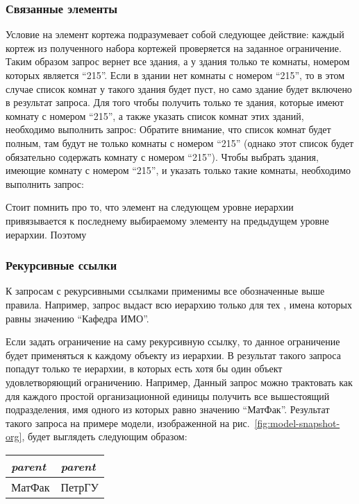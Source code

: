 \subsubsection{Связанные элементы}
Условие на элемент кортежа подразумевает собой следующее действие: каждый кортеж из полученного набора кортежей
проверяется на заданное ограничение. Таким образом запрос
вернет все здания, а у здания только те комнаты, номером которых является ``215''. Если в здании нет комнаты с 
номером ``215'', то в этом случае список комнат у такого здания будет пуст, но само здание будет
включено в результат запроса. Для того чтобы получить
только те здания, которые имеют комнату с номером ``215'', а также указать список комнат этих зданий, необходимо
выполнить запрос:
Обратите внимание, что список комнат будет полным, там будут не только комнаты с номером ``215'' (однако этот список будет 
обязательно содержать комнату с номером ``215''). Чтобы выбрать здания, имеющие комнату с номером ``215'', и 
указать только такие комнаты, необходимо выполнить запрос:

Стоит помнить про то, что элемент на следующем уровне иерархии привязывается к 
последнему выбираемому элементу на предыдущем уровне иерархии. Поэтому






\subsubsection{Рекурсивные ссылки}
К запросам с рекурсивными ссылками применимы все обозначенные выше правила.
Например, запрос
выдаст всю иерархию  только для тех , имена которых равны значению ``Кафедра ИМО''.

Если задать ограничение на саму рекурсивную ссылку, то данное ограничение будет применяться к каждому
объекту из иерархии. В результат такого запроса попадут только те иерархии, в которых есть хотя бы
один объект удовлетворяющий ограничению.
Например, 
Данный запрос можно трактовать как для каждого простой организационной единицы получить 
все вышестоящий подразделения, имя одного из которых равно значению ``МатФак''. Результат
такого запроса на примере модели, изображенной на рис.~\ref{fig:model-snapshot-org}, 
будет выглядеть следующим образом:

\begin{center}
    \begin{tabular}{|l|l|}
	\hline
	\it{parent} & \it{parent}\\[5pt]
	\hline
	\hline
	МатФак & ПетрГУ \\
	\hline
    \end{tabular}
\end{center}


